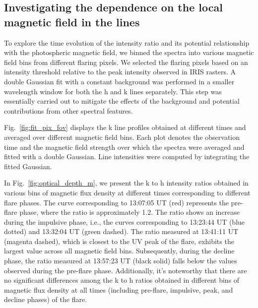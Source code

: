 \subsection{Investigating the dependence on the local magnetic field in the   lines}

To explore the time evolution of the intensity ratio and its potential relationship with the photospheric magnetic field, we binned the spectra into various magnetic field bins from different flaring pixels. We selected the flaring pixels based on an intensity threshold relative to the peak intensity observed in IRIS rasters. A double Gaussian fit with a constant background was performed in a smaller wavelength window for both the   h and k lines separately. This step was essentially carried out to mitigate the effects of the background and potential contributions from other spectral features.

Fig.~\ref{fig:fit_pix_fov} displays the   k line profiles obtained at different times and averaged over different magnetic field bins. Each plot denotes the observation time and the magnetic field strength over which the spectra were averaged and fitted with a double Gaussian. Line intensities were computed by integrating the fitted Gaussian.

In Fig.~\ref{fig:optical_depth_m}, we present the k to h intensity ratios obtained in various bins of magnetic flux density at different times corresponding to different flare phases. The curve corresponding to 13:07:05 UT (red) represents the pre-flare phase, where the ratio is approximately 1.2. The ratio shows an increase during the impulsive phase, i.e., the curves corresponding to 13:23:44 UT (blue dotted) and 13:32:04 UT (green dashed). The ratio measured at 13:41:11 UT (magenta dashed), which is closest to the UV peak of the flare, exhibits the largest value across all magnetic field bins. Subsequently, during the decline phase, the ratio measured at 13:57:23 UT (black solid) falls below the values observed during the pre-flare phase. Additionally, it's noteworthy that there are no significant differences among the k to h ratios obtained in different bins of magnetic flux density at all times (including pre-flare, impulsive, peak, and decline phases) of the flare.

